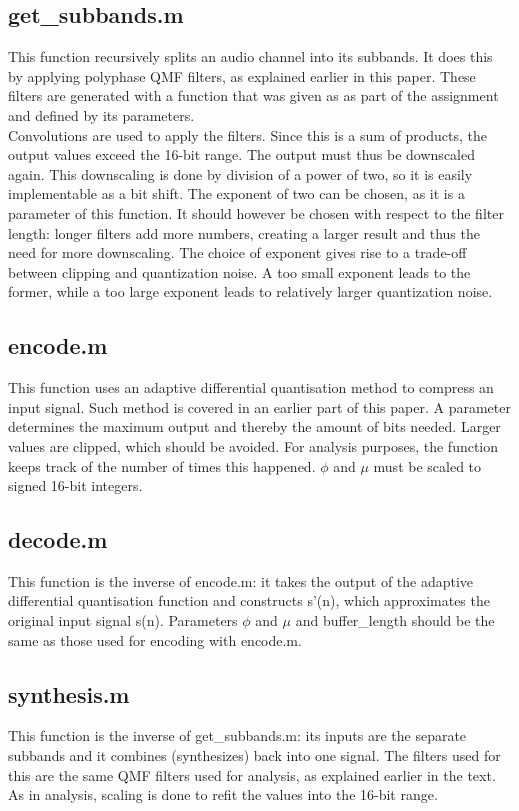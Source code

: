 \documentclass[a4paper]{article}
\begin{document}
\subsection{get\_subbands.m}
This function recursively splits an audio channel into its subbands. It does this by applying polyphase QMF filters, as explained earlier in this paper. These filters are generated with a function that was given as as part of the assignment and defined by its parameters.\\
Convolutions are used to apply the filters. Since this is a sum of products, the output values exceed the 16-bit range. The output must thus be downscaled again. This downscaling is done by division of a power of two, so it is easily implementable as a bit shift. The exponent of two can be chosen, as it is a parameter of this function. It should however be chosen with respect to the filter length: longer filters add more numbers, creating a larger result and thus the need for more downscaling. The choice of exponent gives rise to a trade-off between clipping and quantization noise. A too small exponent leads to the former, while a too large exponent leads to relatively larger quantization noise.

\subsection{encode.m}
This function uses an adaptive differential quantisation method to compress an input signal. Such method is covered in an earlier part of this paper. A parameter determines the maximum output and thereby the amount of bits needed. Larger values are clipped, which should be avoided. For analysis purposes, the function keeps track of the number of times this happened. $\phi$ and $\mu$ must be scaled to signed 16-bit integers.

\subsection{decode.m}
This function is the inverse of encode.m: it takes the output of the adaptive differential quantisation function and constructs s'(n), which approximates the original input signal s(n). Parameters $\phi$ and $\mu$ and buffer\_length should be the same as those used for encoding with encode.m.


\subsection{synthesis.m}
This function is the inverse of get\_subbands.m: its inputs are the separate subbands and it combines (synthesizes) back into one signal. The filters used for this are the same QMF filters used for analysis, as explained earlier in the text. As in analysis, scaling is done to refit the values into the 16-bit range.
\end{document}

